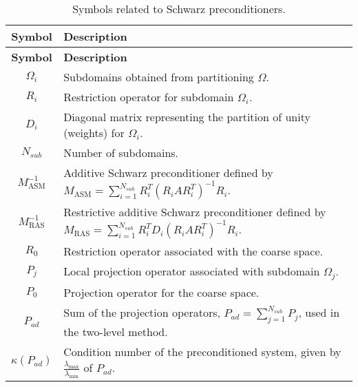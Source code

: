 \begin{longtable}{c p{10cm}}
    \caption{Symbols related to Schwarz preconditioners.}\label{tab:schwarz_symbols}                                                                         \\
    \hline
    \textbf{Symbol}       & \textbf{Description}                                                                                                             \\
    \hline
    \endfirsthead

    \hline
    \textbf{Symbol}       & \textbf{Description}                                                                                                             \\
    \hline
    \endhead

    \hline
    \endfoot

    \hline
    \endlastfoot

    $\Omega_i$            & Subdomains obtained from partitioning $\Omega$.                                                                                  \\
    $R_i$                 & Restriction operator for subdomain $\Omega_i$.                                                                                   \\
    $D_i$                 & Diagonal matrix representing the partition of unity (weights) for $\Omega_i$.                                                    \\
    $N_{sub}$             & Number of subdomains.                                                                                                            \\
    $M^{-1}_{\text{ASM}}$ & Additive Schwarz preconditioner defined by $M_{\text{ASM}} = \sum_{i=1}^{N_{sub}} R_i^T (R_i A R_i^T)^{-1} R_i$.                 \\
    $M^{-1}_{\text{RAS}}$ & Restrictive additive Schwarz preconditioner defined by $M_{\text{RAS}} = \sum_{i=1}^{N_{sub}} R_i^T D_i (R_i A R_i^T)^{-1} R_i$. \\
    $R_0$                 & Restriction operator associated with the coarse space.                                                                           \\
    $P_j$                 & Local projection operator associated with subdomain $\Omega_j$.                                                                  \\
    $P_0$                 & Projection operator for the coarse space.                                                                                        \\
    $P_{ad}$              & Sum of the projection operators, $P_{ad} = \sum_{j=1}^{N_{sub}} P_j$, used in the two-level method.                              \\
    $\kappa(P_{ad})$      & Condition number of the preconditioned system, given by $\frac{\lambda_{\max}}{\lambda_{\min}}$ of $P_{ad}$.                     \\
\end{longtable}

